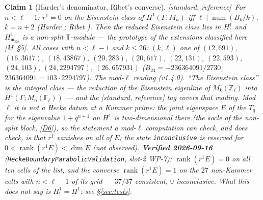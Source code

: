 \documentclass[11pt]{article}
\newtheorem{claim}[theorem]{Claim}
\theoremstyle{remark}
\newcommand{\F}{\mathbb{F}}
\newcommand{\Z}{\mathbb{Z}}
\newcommand{\Ga}{\Gamma}
\newcommand{\Fl}{\F_\ell}
\DeclareMathOperator{\rank}{rank}
\DeclareMathOperator{\num}{num}
\newcommand{\T}{\mathbb{T}}
\newcommand{\m}{\mathfrak{m}}
\newcommand{\Mn}{M_n}
\newcommand{\Mnote}[1]{[M~\S#1]}            %
\newcommand{\STD}{\textsf{[standard, reference]}}
\begin{document}
\begin{claim}[Harder's denominator, Ribet's converse]\label{cl:harder}\STD\
For $n<\ell-1$: $r^1=0$ on the Eisenstein class of $H^1(\Ga;\Mn)$ iff
$\ell\mid\num(B_{k}/k)$, $k=n+2$ (Harder \cite{harder3}; Ribet \cite{ribet}). Then the reduced
Eisenstein class lies in $H^1_!$ and $H^1_{\m_{\mathrm{Eis}}}$ is a non-split $\T$-module ---
the prototype of the extensions classified here \Mnote{5}. All cases with $n<\ell-1$ and
$k\le26$:
$(k,\ell)$ one of $(12,691)$, $(16,3617)$, $(18,43867)$, $(20,283)$, $(20,617)$, $(22,131)$,
$(22,593)$, $(24,103)$, $(24,2294797)$, $(26,657931)$ \cite{washington} ($B_{24}=-236364091/2730$,
$236364091=103\cdot2294797$).
\emph{The mod-$\ell$ reading (v1.4.0).} ``The Eisenstein class'' is the integral class --- the
reduction of the Eisenstein eigenline of $M_k(\Z_\ell)$ into $H^1(\Ga;\Mn(\Fl))$ --- and the
\STD{} tag covers that reading. Mod $\ell$ it is \emph{not} a Hecke datum at a Kummer prime: the
joint eigenspace $E$ of the $T_q$ for the eigenvalue $1+q^{n+1}$ on $H^1$ is two-dimensional
there (the socle of the non-split block, \ref{D6}), so the statement a mod-$\ell$ computation can
check, and does check, is that $r^1$ vanishes on \emph{all} of $E$; the state
\texttt{inconclusive} is reserved for $0<\rank(r^1E)<\dim E$ (not observed).
\textbf{Verified 2026-09-16} (\texttt{HeckeBoundaryParabolicValidation}, slot-2 WP-7):
$\rank(r^1E)=0$ on all ten cells of the list, and the converse $\rank(r^1E)=1$ on the $27$
non-Kummer cells with $n<\ell-1$ of its grid --- $37/37$ consistent, $0$ inconclusive. What this
does \emph{not} say is $H^1_!=H^1$: see \S\ref{sec:tests}.


\end{claim}
\end{document}
